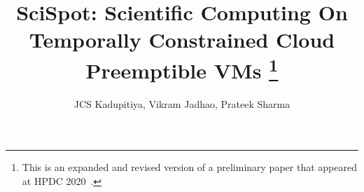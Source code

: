 \documentclass[compsoc]{IEEEtran}
\begin{document}
\title{SciSpot: Scientific Computing On Temporally Constrained Cloud Preemptible VMs \thanks{{This is an expanded and revised version of a preliminary paper that appeared at HPDC 2020~\cite{scispot-hpdc20}.}}}

\author{JCS Kadupitiya, Vikram Jadhao, Prateek Sharma}
\maketitle 


\begin{abstract}
  
\end{abstract}





%





%

%





%








{


%
}


\end{document}
